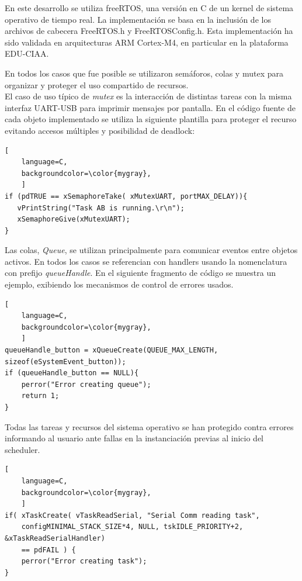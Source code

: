 En este desarrollo se utiliza freeRTOS, una versión en C de un kernel de sistema operativo de tiempo real. La implementación se basa en la inclusión de los archivos de cabecera FreeRTOS.h y FreeRTOSConfig.h. Esta implementación ha sido validada en arquitecturas ARM Cortex-M4, en particular en la plataforma EDU-CIAA. 

En todos los casos que fue posible se utilizaron semáforos, colas y mutex para organizar y proteger el uso compartido de recursos. \\

El caso de uso típico de \textit{mutex} es la interacción de distintas tareas con la misma interfaz UART-USB para imprimir mensajes por pantalla. En el código fuente de cada objeto implementado se utiliza la siguiente plantilla para proteger el recurso evitando accesos múltiples y posibilidad de deadlock:\\

\begin{lstlisting}[
	language=C, 
	backgroundcolor=\color{mygray},
	]
if (pdTRUE == xSemaphoreTake( xMutexUART, portMAX_DELAY)){
   vPrintString("Task AB is running.\r\n");
   xSemaphoreGive(xMutexUART);
}
\end{lstlisting}

Las colas, \textit{Queue}, se utilizan principalmente para comunicar eventos entre objetos activos. En todos los casos se referencian con handlers usando la nomenclatura con prefijo \textit{queueHandle}. En el siguiente fragmento de código se muestra un ejemplo, exibiendo los mecanismos de control de errores usados. \\

\begin{lstlisting}[
	language=C, 
	backgroundcolor=\color{mygray},
	]
queueHandle_button = xQueueCreate(QUEUE_MAX_LENGTH, sizeof(eSystemEvent_button));
if (queueHandle_button == NULL){
    perror("Error creating queue");
    return 1;
}
\end{lstlisting}


Todas las tareas y recursos del sistema operativo se han protegido contra errores informando al usuario ante fallas en la instanciación previas al inicio del scheduler.

\begin{lstlisting}[
	language=C, 
	backgroundcolor=\color{mygray},
	]
if( xTaskCreate( vTaskReadSerial, "Serial Comm reading task", 
    configMINIMAL_STACK_SIZE*4, NULL, tskIDLE_PRIORITY+2, &xTaskReadSerialHandler) 
    == pdFAIL ) {
    perror("Error creating task");
}
\end{lstlisting}

